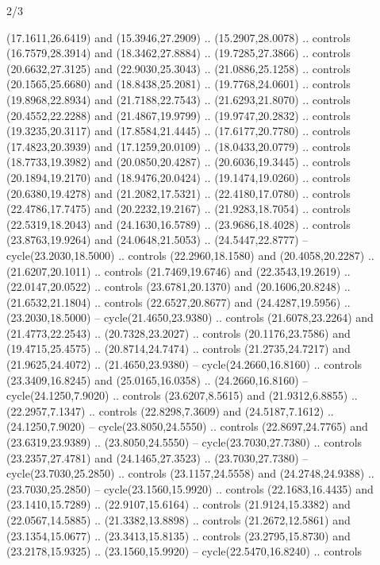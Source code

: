 \begin{flagdescription}{2/3}
\begin{scope}[yshift=\flagwidth,scale=\flagwidth/1241.93737]
\begin{scope}[y=-1mm, x=1mm,draw=gold,fill=blue,line join=miter,miter limit=4,line width=1.8\lw]
\begin{scope}[y=1mm, x=1mm, yscale=-1,shift={(573.68mm+\str,145.75)}]
\begin{scope}[scale=1.35,shift={(-9,-3)}]
\begin{scope}[scale=0.55]
\begin{scope}[scale=1.333]
    (17.1611,26.6419) and (15.3946,27.2909) .. (15.2907,28.0078) .. controls
    (16.7579,28.3914) and (18.3462,27.8884) .. (19.7285,27.3866) .. controls
    (20.6632,27.3125) and (22.9030,25.3043) .. (21.0886,25.1258) .. controls
    (20.1565,25.6680) and (18.8438,25.2081) .. (19.7768,24.0601) .. controls
    (19.8968,22.8934) and (21.7188,22.7543) .. (21.6293,21.8070) .. controls
    (20.4552,22.2288) and (21.4867,19.9799) .. (19.9747,20.2832) .. controls
    (19.3235,20.3117) and (17.8584,21.4445) .. (17.6177,20.7780) .. controls
    (17.4823,20.3939) and (17.1259,20.0109) .. (18.0433,20.0779) .. controls
    (18.7733,19.3982) and (20.0850,20.4287) .. (20.6036,19.3445) .. controls
    (20.1894,19.2170) and (18.9476,20.0424) .. (19.1474,19.0260) .. controls
    (20.6380,19.4278) and (21.2082,17.5321) .. (22.4180,17.0780) .. controls
    (22.4786,17.7475) and (20.2232,19.2167) .. (21.9283,18.7054) .. controls
    (22.5319,18.2043) and (24.1630,16.5789) .. (23.9686,18.4028) .. controls
    (23.8763,19.9264) and (24.0648,21.5053) .. (24.5447,22.8777) --
    cycle(23.2030,18.5000) .. controls (22.2960,18.1580) and (20.4058,20.2287) ..
    (21.6207,20.1011) .. controls (21.7469,19.6746) and (22.3543,19.2619) ..
    (22.0147,20.0522) .. controls (23.6781,20.1370) and (20.1606,20.8248) ..
    (21.6532,21.1804) .. controls (22.6527,20.8677) and (24.4287,19.5956) ..
    (23.2030,18.5000) -- cycle(21.4650,23.9380) .. controls (21.6078,23.2264) and
    (21.4773,22.2543) .. (20.7328,23.2027) .. controls (20.1176,23.7586) and
    (19.4715,25.4575) .. (20.8714,24.7474) .. controls (21.2735,24.7217) and
    (21.9625,24.4072) .. (21.4650,23.9380) -- cycle(24.2660,16.8160) .. controls
    (23.3409,16.8245) and (25.0165,16.0358) .. (24.2660,16.8160) --
    cycle(24.1250,7.9020) .. controls (23.6207,8.5615) and (21.9312,6.8855) ..
    (22.2957,7.1347) .. controls (22.8298,7.3609) and (24.5187,7.1612) ..
    (24.1250,7.9020) -- cycle(23.8050,24.5550) .. controls (22.8697,24.7765) and
    (23.6319,23.9389) .. (23.8050,24.5550) -- cycle(23.7030,27.7380) .. controls
    (23.2357,27.4781) and (24.1465,27.3523) .. (23.7030,27.7380) --
    cycle(23.7030,25.2850) .. controls (23.1157,24.5558) and (24.2748,24.9388) ..
    (23.7030,25.2850) -- cycle(23.1560,15.9920) .. controls (22.1683,16.4435) and
    (23.1410,15.7289) .. (22.9107,15.6164) .. controls (21.9124,15.3382) and
    (22.0567,14.5885) .. (21.3382,13.8898) .. controls (21.2672,12.5861) and
    (23.1354,15.0677) .. (23.3413,15.8135) .. controls (23.2795,15.8730) and
    (23.2178,15.9325) .. (23.1560,15.9920) -- cycle(22.5470,16.8240) .. controls

\end{scope}
\end{scope}
\end{scope}
\end{scope}
\end{scope}
\end{scope}
\end{flagdescription}
